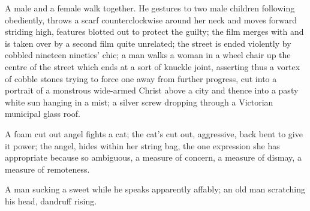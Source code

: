 \documentclass[
]{memoir}
\newlength{\drop}%
\begin{document}
A male and a female walk together. He gestures to two male children
following obediently, throws a scarf counterclockwise around her neck
and moves forward striding high, features blotted out to protect the
guilty; the film merges with and is taken over by a second film quite
unrelated; the street is ended violently by cobbled nineteen nineties'
chic; a man walks a woman in a wheel chair up the centre of the street
which ends at a sort of knuckle joint, asserting thus a vortex of cobble
stones trying to force one away from further progress, cut into a
portrait of a monstrous wide-armed Christ above a city and thence into a
pasty white sun hanging in a mist; a silver screw dropping through a
Victorian municipal glass roof.

A foam cut out angel fights a cat; the cat's cut out, aggressive, back
bent to give it power; the angel, hides within her string bag, the one
expression she has appropriate because so ambiguous, a measure of
concern, a measure of dismay, a measure of remoteness.

A man sucking a sweet while he speaks apparently affably; an old man
scratching his head, dandruff rising.

\end{document}
